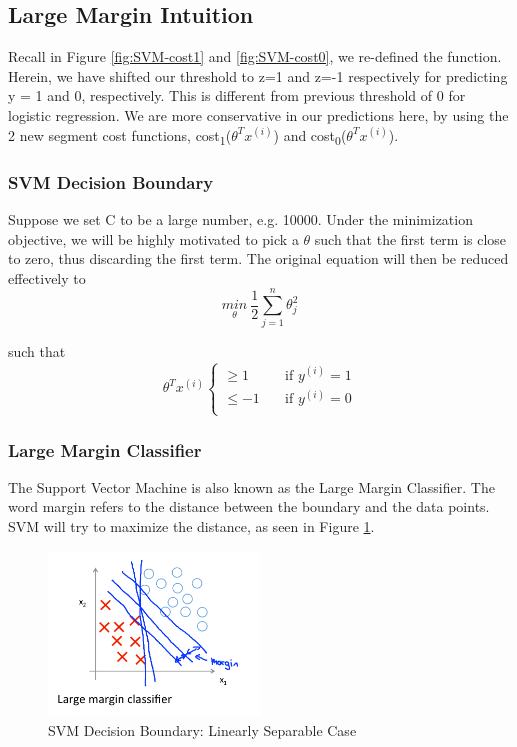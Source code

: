 \subsection{Large Margin Intuition}
Recall in Figure \ref{fig:SVM-cost1} and \ref{fig:SVM-cost0}, we re-defined the function. Herein, we have shifted our threshold to z=1 and z=-1 respectively for predicting y = 1 and 0, respectively. This is different from previous threshold of 0 for logistic regression. We are more conservative in our predictions here, by using the 2 new segment cost functions, cost\textsubscript{1}($\theta^T x^{(i)}$) and cost\textsubscript{0}($\theta^T x^{(i)}$). 
    \subsubsection{SVM Decision Boundary}
    Suppose we set C to be a large number, e.g. 10000. Under the minimization objective, we will be highly motivated to pick a $\theta$ such that the first term is close to zero, thus discarding the first term. 
    The original equation will then be reduced effectively to 
    \[
        \underset{\theta}{min} \: \frac{1}{2} \sum_{j=1}^{n} \theta_j^2
    \] 
    
    such that 
    \[
    \theta^T x^{(i)}
         \begin{cases}
       \geq 1 &\quad \text{if } y^{(i)} = 1\\
       \leq -1 &\quad \text{if } y^{(i)} = 0  \\
        \end{cases}
    \] 

    \subsubsection{Large Margin Classifier}
    The Support Vector Machine is also known as the Large Margin Classifier. The word margin refers to the distance between the boundary and the data points. SVM will try to maximize the distance, as seen in Figure \ref{fig:SVM-decision-boundary-margin}. 
    \begin{figure}[htbp]
        \centering
        \includegraphics[width=0.5\textwidth]{image/SVM-decision-boundary-margin.png}
        \caption{SVM Decision Boundary: Linearly Separable Case}
        \label{fig:SVM-decision-boundary-margin}
    \end{figure}


